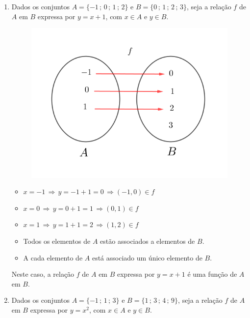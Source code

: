 \begin{enumerate}

\item Dados os conjuntos $A = \{ -1\,;\,0\,;\,1\,;\,2\}$ e $B = \{0\,;\,1\,;\,2\,;\,3\}$, seja a relação $f$ de $A$ em $B$ expressa por $y=x+1$, com $x\in A$ e $y \in B$.

\begin{figure}[H]
	\centering
	
	\includegraphics[scale=3.5]{imagens/funcao-ex1.png}

\end{figure}
\begin{itemize}
\item $x= -1 \, \Rightarrow \,y = -1+1 = 0  \, \Rightarrow (-1,0) \in f$
\item $x= 0 \, \Rightarrow \,y = 0+1 = 1 \, \Rightarrow (0,1) \in f $
\item $x= 1 \, \Rightarrow \,y = 1+1 = 2  \, \Rightarrow (1,2) \in f$

\item Todos os elementos de $A$ estão associados a elementos de $B$.
\item A cada elemento de $A$ está associado um único elemento de $B$.
\end{itemize}
Neste caso, a relação $f$ de $A$ em $B$ expressa por $y=x+1$ é uma função de $A$ em $B$.

\item Dados os conjuntos $A = \{ -1\,;\,1\,;\,3\}$ e $B = \{1\,;\,3\,;\,4\,;\,9\}$, seja a relação $f$ de $A$ em $B$ expressa por $y=x^2$, com $x\in A$ e $y \in B$.


\end{enumerate}
